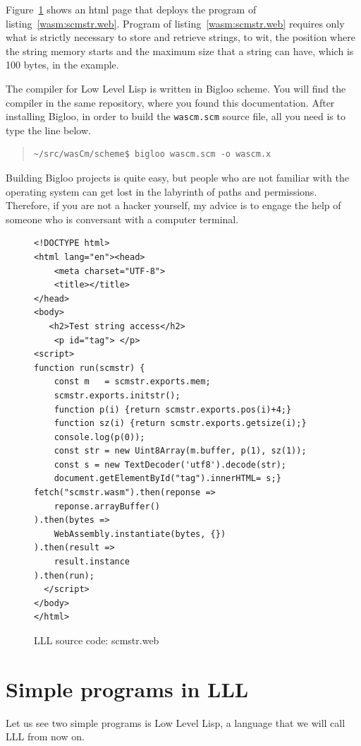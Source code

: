 \documentclass[a4paper,12pt]{book}
\begin{document}
Figure~\ref{wasm:scmstr.html} shows an html page that
deploys the program of listing~\ref{wasm:scmstr.web}.
Program of listing~\ref{wasm:scmstr.web} requires
only what is strictly necessary to store and
retrieve strings, to wit, the position where the
string memory starts and the maximum size that
a string can have, which is 100 bytes, in the example.

The compiler for Low Level Lisp is written in Bigloo
scheme. You will find the compiler in the same repository,
where you found this documentation. After installing
Bigloo, in order to build the \verb|wascm.scm| source
file, all you need is to type the line below.
\begin{quote}
\begin{verbatim}
~/src/wasCm/scheme$ bigloo wascm.scm -o wascm.x
\end{verbatim}
\end{quote}
Building Bigloo projects is quite easy, but people
who are not familiar with the operating system
can get lost in the labyrinth of paths and permissions.
Therefore, if you are not a hacker yourself, my
advice is to engage the help of someone who
is conversant with a computer terminal.


\begin{figure}[!h]
\begin{verbatim}
<!DOCTYPE html>
<html lang="en"><head>
    <meta charset="UTF-8">
    <title></title>
</head>
<body>
   <h2>Test string access</h2>
    <p id="tag"> </p>
<script>
function run(scmstr) {
    const m   = scmstr.exports.mem;
    scmstr.exports.initstr();
    function p(i) {return scmstr.exports.pos(i)+4;}
    function sz(i) {return scmstr.exports.getsize(i);}
    console.log(p(0));
    const str = new Uint8Array(m.buffer, p(1), sz(1));
    const s = new TextDecoder('utf8').decode(str);
    document.getElementById("tag").innerHTML= s;}
fetch("scmstr.wasm").then(reponse =>
    reponse.arrayBuffer()
).then(bytes =>
    WebAssembly.instantiate(bytes, {})
).then(result =>
    result.instance
).then(run);
  </script>
</body>
</html>
\end{verbatim}
\caption{LLL source code: scmstr.web}
\label{wasm:scmstr.html}  
\end{figure}


\chapter{Simple programs in LLL}

Let us see two simple programs is Low Level Lisp,
a language that we will call LLL from now on.
\end{document}
